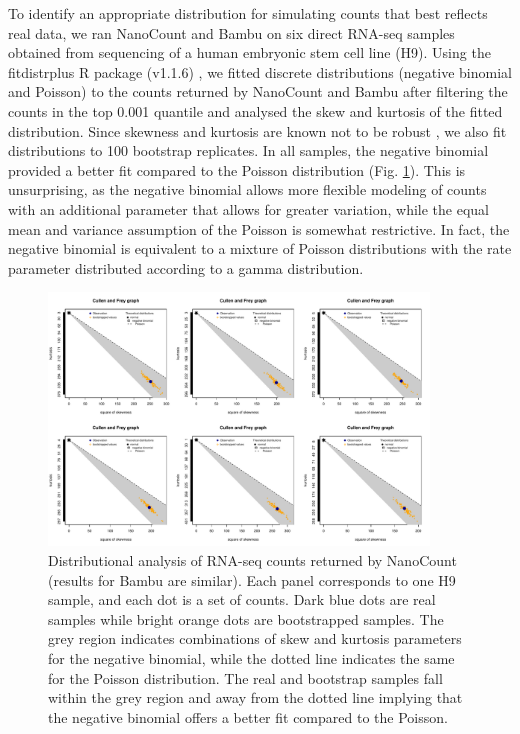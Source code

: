 To identify an appropriate distribution for simulating counts that best reflects real data, we ran NanoCount and Bambu on six direct RNA-seq samples obtained from sequencing of a human embryonic stem cell line (H9). Using the fitdistrplus R package (v1.1.6) \cite{Delignette-Muller2015}, we fitted discrete distributions (negative binomial and Poisson) to the counts returned by NanoCount and Bambu after filtering the counts in the top 0.001 quantile and analysed the skew and kurtosis of the fitted distribution. Since skewness and kurtosis are known not to be robust \cite{Delignette-Muller2015}, we also fit distributions to 100 bootstrap replicates. In all samples, the negative binomial provided a better fit compared to the Poisson distribution (Fig. \ref{fig:app-c}). This is unsurprising, as the negative binomial allows more flexible modeling of counts with an additional parameter that allows for greater variation, while the equal mean and variance assumption of the Poisson is somewhat restrictive. In fact, the negative binomial is equivalent to a mixture of Poisson distributions with the rate parameter distributed according to a gamma distribution. 
\begin{figure}[H]
    \centering
    \includegraphics[width=0.9\textwidth]{figures/ap-c.pdf}
    \caption[Distributional analysis of RNA-seq counts]{Distributional analysis of RNA-seq counts returned by NanoCount (results for Bambu are similar). Each panel corresponds to one H9 sample, and each dot is a set of counts. Dark blue dots are real samples while bright orange dots are bootstrapped samples. The grey region indicates combinations of skew and kurtosis parameters for the negative binomial, while the dotted line indicates the same for the Poisson distribution. The real and bootstrap samples fall within the grey region and away from the dotted line implying that the negative binomial offers a better fit compared to the Poisson.}
    \label{fig:app-c}
\end{figure}

